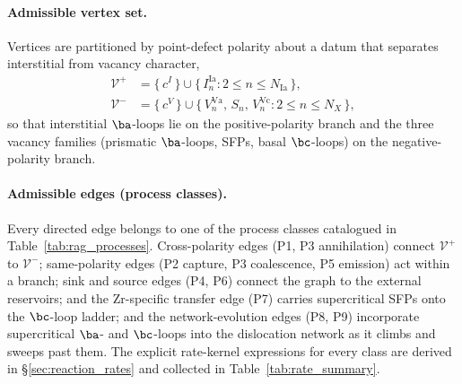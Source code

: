 \paragraph{Admissible vertex set.}
Vertices are partitioned by point-defect polarity about a datum that
separates interstitial from vacancy character,
\begin{align}
    \mathcal{V}^{+} &= \{\,c^{I}\,\}\cup\{\,I_n^{\mathrm{Ia}}:2\le n\le N_{\mathrm{Ia}}\,\},
    \label{eq:zr_vset_plus}\\[2pt]
    \mathcal{V}^{-} &= \{\,c^{V}\,\}\cup\{\,V_n^{\mathrm{Va}},\,S_n,\,V_n^{\mathrm{Vc}}:2\le n\le N_{X}\,\},
    \label{eq:zr_vset_minus}
\end{align}
so that interstitial $\ba$-loops lie on the positive-polarity branch and
the three vacancy families (prismatic $\ba$-loops, SFPs, basal
$\bc$-loops) on the negative-polarity branch.

\paragraph{Admissible edges (process classes).}
Every directed edge belongs to one of the process classes catalogued in
Table~\ref{tab:rag_processes}. Cross-polarity edges (P1, P3 annihilation)
connect $\mathcal{V}^{+}$ to $\mathcal{V}^{-}$; same-polarity edges
(P2 capture, P3 coalescence, P5 emission) act within a branch; sink and
source edges (P4, P6) connect the graph to the external reservoirs; and
the Zr-specific transfer edge (P7) carries supercritical SFPs onto the
$\bc$-loop ladder; and the network-evolution edges (P8, P9) incorporate supercritical $\ba$- and $\bc$-loops into the dislocation network as it climbs and sweeps past them. The explicit rate-kernel expressions for every class
are derived in \S\ref{sec:reaction_rates} and collected in
Table~\ref{tab:rate_summary}.

